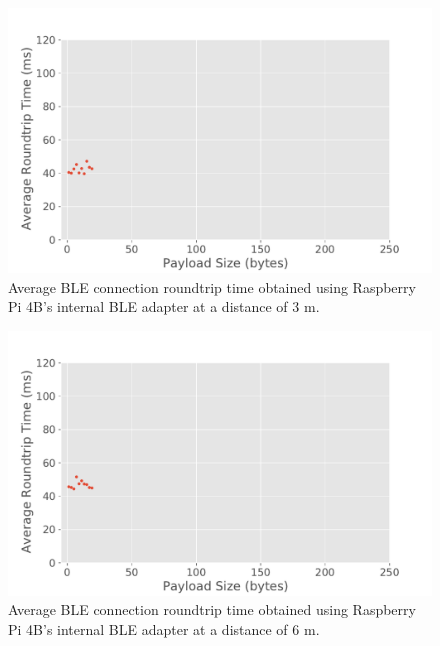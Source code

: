 \begin{figure}[H]
    \centering
    \includegraphics[width=0.75\linewidth]{images/ble-roundtrip-hci1-300cm.pdf}
    \caption[Average \acs{BLE} connection roundtrip time obtained using Raspberry Pi 4B's internal \acs{BLE} adapter at a distance of 3 m.]{Average \acs{BLE} connection roundtrip time obtained using Raspberry Pi 4B's internal \acs{BLE} adapter at a distance of $3\text{ m}$.}
    \label{fig:ble-roundtrip-hci1-3m}
\end{figure}

\begin{figure}[H]
    \centering
    \includegraphics[width=0.75\linewidth]{images/ble-roundtrip-hci1-600cm.pdf}
    \caption[Average \acs{BLE} connection roundtrip time obtained using Raspberry Pi 4B's internal \acs{BLE} adapter at a distance of 6 m.]{Average \acs{BLE} connection roundtrip time obtained using Raspberry Pi 4B's internal \acs{BLE} adapter at a distance of $6\text{ m}$.}
    \label{fig:ble-roundtrip-hci1-6m}
\end{figure}

